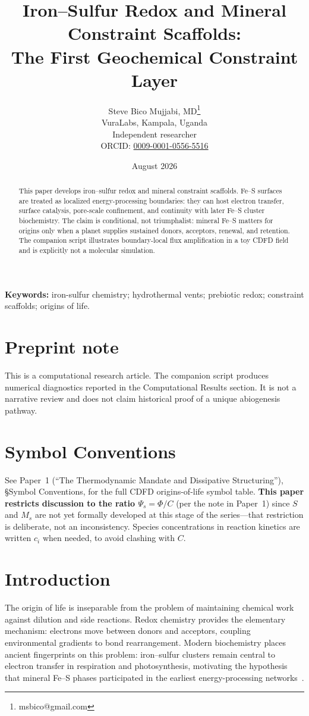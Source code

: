 \documentclass[11pt,a4paper]{article}
\title{Iron--Sulfur Redox and Mineral Constraint Scaffolds:\\ The First Geochemical Constraint Layer}
\author{Steve Bico Mujjabi, MD\thanks{msbico@gmail.com}\\
VuraLabs, Kampala, Uganda\\
Independent researcher\\
ORCID: \href{https://orcid.org/0009-0001-0556-5516}{0009-0001-0556-5516}}
\date{August 2026}
\begin{document}
\maketitle

\begin{abstract}
This paper develops iron--sulfur redox and mineral constraint scaffolds. Fe--S surfaces are treated as localized energy-processing boundaries: they can host electron transfer, surface catalysis, pore-scale confinement, and continuity with later Fe--S cluster biochemistry. The claim is conditional, not triumphalist: mineral Fe--S matters for origins only when a planet supplies sustained donors, acceptors, renewal, and retention. The companion script illustrates boundary-local flux amplification in a toy CDFD field and is explicitly not a molecular simulation.
\end{abstract}

\noindent\textbf{Keywords:} iron-sulfur chemistry; hydrothermal vents; prebiotic redox; constraint scaffolds; origins of life.

\section*{Preprint note}
This is a computational research article. The companion script produces numerical diagnostics reported in the Computational Results section. It is not a narrative review and does not claim historical proof of a unique abiogenesis pathway.

\section*{Symbol Conventions}
See Paper~1 (``The Thermodynamic Mandate and Dissipative Structuring''), \S Symbol Conventions, for the full CDFD origins-of-life symbol table. \textbf{This paper restricts discussion to the ratio $\Psi_s=\Phi/C$} (per the note in Paper~1) since $S$ and $M_s$ are not yet formally developed at this stage of the series---that restriction is deliberate, not an inconsistency. Species concentrations in reaction kinetics are written $c_i$ when needed, to avoid clashing with $C$.

\section{Introduction}
The origin of life is inseparable from the problem of maintaining chemical work against dilution and side reactions. Redox chemistry provides the elementary mechanism: electrons move between donors and acceptors, coupling environmental gradients to bond rearrangement. Modern biochemistry places ancient fingerprints on this problem: iron--sulfur clusters remain central to electron transfer in respiration and photosynthesis, motivating the hypothesis that mineral Fe--S phases participated in the earliest energy-processing networks~\cite{Russell1994,Martin2007,Branscomb2018}.
\end{document}
